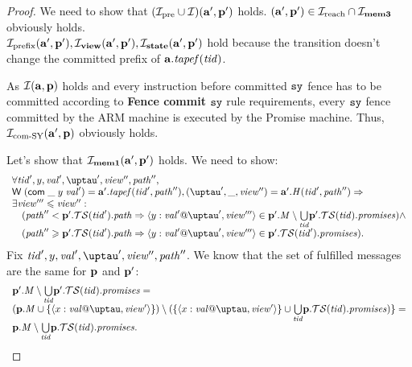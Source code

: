 \begin{proof}
We need to show that $(\mathcal{I}_{\textup{\rm pre}} \cup \mathcal{I})(\mathbf{a}', \mathbf{p}')$ holds.
$(\mathbf{a}', \mathbf{p}') \in \mathcal{I}_{\textup{\rm reach}} \cap \mathcal{I}_{\rm \bf mem3}$ obviously holds. \\
$\mathcal{I}_{\textup{\rm prefix}}(\mathbf{a}', \mathbf{p}'), \mathcal{I}_{\rm \bf view}(\mathbf{a}', \mathbf{p}'), \mathcal{I}_{\rm \bf state}(\mathbf{a}', \mathbf{p}')$ hold because
  the  transition doesn't change the committed prefix of $\mathbf{a}.\mathit{tapef}(\mathit{tid})$.

  As $\mathcal{I}(\mathbf{a}, \mathbf{p})$ holds and every instruction before committed $\mathtt{sy}$ fence has to be committed according to
  {\sf \bf Fence commit} $\mathtt{sy}$ rule requirements, every $\mathtt{sy}$ fence committed by the ARM machine is executed by the Promise
  machine. Thus, $\mathcal{I}_{\textup{\rm com-SY}}(\mathbf{a}', \mathbf{p})$ obviously holds.

\noindent
Let's show that $\mathcal{I}_{\rm \bf mem1}(\mathbf{a}', \mathbf{p}')$ holds.
  We need to show: \\
  \[\begin{array}{l}
  \forall \tId', y, \stval', \tau', \R'', \cpath'', \\
  \tapeWrite{(\tapeWriteCommitted{\_}{y}{\stval'})} = \aT'.\tapef(\tId', \cpath''),
    (\tau', \_, \R'') = \aT'.\hmap(\tId', \cpath'') => \\
  \exists \R''' \le \R'': \\
  \quad (\cpath'' <   \p'.\TSfprom(\tId').\cpath => \writeEvt{y}{\stval'}{\tau'}{\R'''} \in
      \p'.\Mprom \setminus \underset{\tId}{\bigcup} \p'.\TSfprom(\tId).\PromSet) \land \\
  \quad (\cpath'' \ge \p'.\TSfprom(\tId').\cpath => \writeEvt{y}{\stval'}{\tau'}{\R'''} \in \p'.\TSfprom(\tId').\PromSet).\\
  \end{array}\]
  Fix $\tId', y, \stval', \tau', \R'', \cpath''$.
  We know that the set of fulfilled messages are the same for $\mathbf{p}$ and $\mathbf{p}'$:
  \[\begin{array}{l}
  \p'.\Mprom \setminus \underset{\tId}{\bigcup} \p'.\TSfprom(\tId).\PromSet = \\
    (\p.\Mprom \cup \{\writeEvt{x}{\stval}{\tau}{\R'}\}) \setminus
       (\{\writeEvt{x}{\stval}{\tau}{\R'}\} \cup \underset{\tId}{\bigcup} \p.\TSfprom(\tId).\PromSet)\} = \\
    \p.\Mprom \setminus \underset{\tId}{\bigcup} \p.\TSfprom(\tId).\PromSet.
  \end{array}\]
  

\end{proof}

